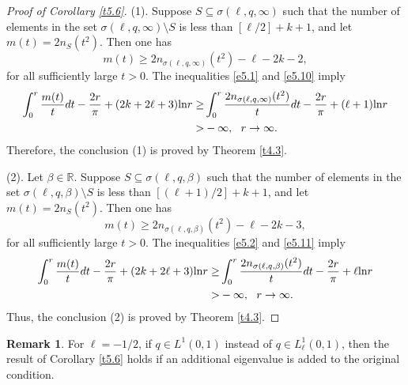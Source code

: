 \documentclass[reqno,12pt,centertags]{amsart}
\renewcommand{\ln}{\text{\rm ln}}
\numberwithin{equation}{section}
\theoremstyle{definition}
\newtheorem{remark}{Remark}[section]
\begin{document}
\begin{proof}[Proof of Corollary \ref{t5.6}]
(1).
Suppose $S\subseteq\sigma(\ell,q,\infty)$ such that the number of elements in the set $\sigma(\ell,q,\infty)\setminus S$ is less than $[\ell/2]+k+1$, 
and let $m(t)=2n_S(t^2)$. Then one has 
\begin{equation}\label{e5.10}
m(t)\geq 2n_{\sigma(\ell, q,\infty)}(t^2)-\ell-2k-2,
\end{equation}
for all sufficiently large $t>0$. The inequalities \eqref{e5.1} and \eqref{e5.10} imply 
\begin{align*}
\int_{0}^{r}\frac{m(t)}{t}dt-\frac{2r}{\pi}+(2k+2\ell+3)\ln r
\geq&\int_{0}^{r}\frac{2n_{\sigma(\ell, q,\infty)}(t^2)}{t}dt
-\frac{2r}{\pi}+(\ell+1)\ln r\\
>&-\infty, ~~r\rightarrow\infty.
\end{align*}
Therefore, the conclusion (1) is proved by Theorem \ref{t4.3}.

(2). Let $\beta\in\mathbb{R}$. 
Suppose $S\subseteq\sigma(\ell,q,\beta)$ such that the number of elements in the set $\sigma(\ell,q,\beta)\setminus S$ is less than $[(\ell+1)/2]+k+1$, 
and let 
$m(t)=2n_S(t^2)$. Then one has  
\begin{equation}\label{e5.11}
m(t)\geq 2n_{\sigma(\ell, q,\beta)}(t^2)-\ell-2k-3,
\end{equation}
for all sufficiently large $t>0$. The inequalities \eqref{e5.2} and \eqref{e5.11} imply 
\begin{align*}
\int_{0}^{r}\frac{m(t)}{t}dt
-\frac{2r}{\pi}+(2k+2\ell+3)\ln r
\geq&\int_{0}^{r}\frac{2n_{\sigma(\ell, q,\beta)}(t^2)}{t}dt
-\frac{2r}{\pi}+\ell\ln r\\
>&-\infty, ~~r\rightarrow\infty.
\end{align*}
Thus, the conclusion (2) is proved by Theorem \ref{t4.3}.
\end{proof}

\begin{remark}\label{r5.3}
For $\ell=-1/2$, if $q \in L^{1}(0,1)$ instead of $q \in L^{1}_{\ell}(0,1)$, then the result of Corollary \ref{t5.6} holds if an additional eigenvalue is added to the original condition.
\end{remark}
\end{document}
